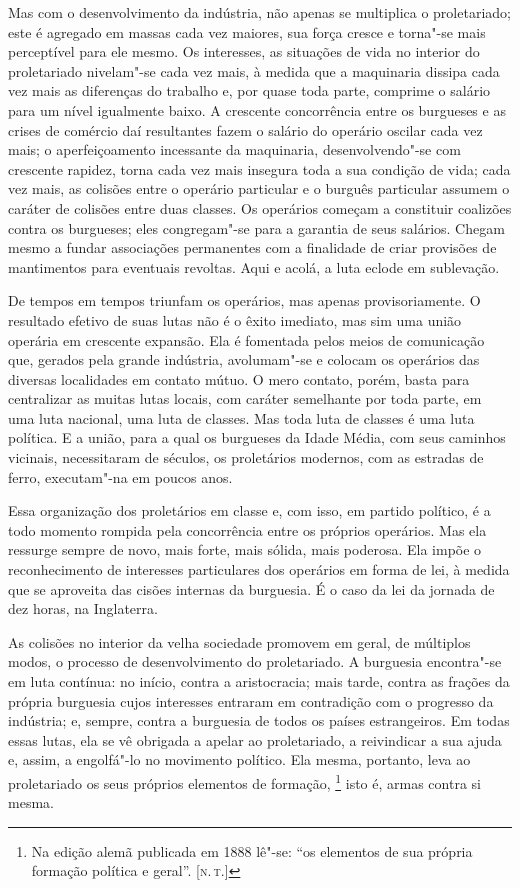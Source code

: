 Mas com o desenvolvimento da indústria, não apenas se multiplica o
proletariado; este é agregado em massas cada vez maiores, sua força
cresce e torna"-se mais perceptível para ele mesmo. Os interesses, as
situações de vida no interior do proletariado nivelam"-se cada vez
mais, à medida que a maquinaria dissipa cada vez mais as diferenças do
trabalho e, por quase toda parte, comprime o salário para um nível
igualmente baixo. A crescente concorrência entre os burgueses e as
crises de comércio daí resultantes fazem o salário do operário oscilar
cada vez mais; o aperfeiçoamento incessante da maquinaria,
desenvolvendo"-se com crescente rapidez, torna cada vez mais insegura
toda a sua condição de vida; cada vez mais, as colisões entre o
operário particular e o burguês particular assumem o caráter de
colisões entre duas classes. Os operários começam a constituir
coalizões contra os burgueses; eles congregam"-se para a garantia de
seus salários. Chegam mesmo a fundar associações permanentes com a
finalidade de criar provisões de mantimentos para eventuais revoltas.
Aqui e acolá, a luta eclode em sublevação.

De tempos em tempos triunfam os operários, mas apenas provisoriamente. O
resultado efetivo de suas lutas não é o êxito imediato, mas sim uma
união operária em crescente expansão. Ela é fomentada pelos meios de
comunicação que, gerados pela grande indústria, avolumam"-se e
colocam os operários das diversas localidades em contato mútuo. O mero
contato, porém, basta para centralizar as muitas lutas locais, com
caráter semelhante por toda parte, em uma luta nacional, uma luta de
classes. Mas toda luta de classes é uma luta política. E a união, para
a qual os burgueses da Idade Média, com seus caminhos vicinais,
necessitaram de séculos, os proletários modernos, com as estradas de
ferro, executam"-na em poucos anos.

Essa organização dos proletários em classe e, com isso, em partido
político, é a todo momento rompida pela concorrência entre os próprios
operários. Mas ela ressurge sempre de novo, mais forte, mais sólida,
mais poderosa. Ela impõe o reconhecimento de interesses particulares
dos operários em forma de lei, à medida que se aproveita das cisões
internas da burguesia. É o caso da lei da jornada de dez horas, na
Inglaterra.

As colisões no interior da velha sociedade promovem em geral, de
múltiplos modos, o processo de desenvolvimento do proletariado. A
burguesia encontra"-se em luta contínua: no início, contra a
aristocracia; mais tarde, contra as frações da própria burguesia cujos
interesses entraram em contradição com o progresso da indústria; e,
sempre, contra a burguesia de todos os países estrangeiros. Em todas
essas lutas, ela se vê obrigada a apelar ao proletariado, a reivindicar
a sua ajuda e, assim, a engolfá"-lo no movimento político. Ela mesma,
portanto, leva ao proletariado os seus próprios elementos de
formação, \footnote{Na edição alemã publicada em 1888 lê"-se: ``os elementos	
de sua própria formação política e geral''. [\textsc{n.\,t.}]} isto é, armas contra 
si mesma.

